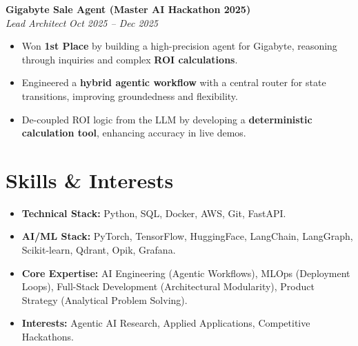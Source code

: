 \documentclass[10pt, a4paper]{article}
\newcommand{\entryheader}[4]{
    \noindent\textbf{#1} \hfill #2 \\
    \textit{#3} \hfill \textit{#4} \par
}
\begin{document}
\vspace{3pt}
\entryheader{Gigabyte Sale Agent (Master AI Hackathon 2025)}{}{Lead Architect}{Oct 2025 -- Dec 2025}
\begin{itemize}
    \item Won \textbf{1st Place} by building a high-precision agent for Gigabyte, reasoning through inquiries and complex \textbf{ROI calculations}.
    \item Engineered a \textbf{hybrid agentic workflow} with a central router for state transitions, improving groundedness and flexibility.
    \item De-coupled ROI logic from the LLM by developing a \textbf{deterministic calculation tool}, enhancing accuracy in live demos.
\end{itemize}

\section{Skills \& Interests}
\begin{itemize}
    \item \textbf{Technical Stack:} Python, SQL, Docker, AWS, Git, FastAPI.
    \item \textbf{AI/ML Stack:} PyTorch, TensorFlow, HuggingFace, LangChain, LangGraph, Scikit-learn, Qdrant, Opik, Grafana.
    \item \textbf{Core Expertise:} AI Engineering (Agentic Workflows), MLOps (Deployment Loops), Full-Stack Development (Architectural Modularity), Product Strategy (Analytical Problem Solving).
    \item \textbf{Interests:} Agentic AI Research, Applied Applications, Competitive Hackathons.
\end{itemize}
\end{document}
